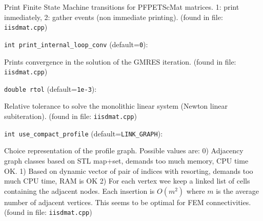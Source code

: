Print Finite State Machine transitions for PFPETScMat matrices.
1: print inmediately, 2: gather events (non immediate printing). 
 (found in file: \verb+iisdmat.cpp+)
\item\verb+int print_internal_loop_conv+ {\rm(default=\verb|0|)}:

Prints convergence in the solution of the GMRES iteration. 
 (found in file: \verb+iisdmat.cpp+)
\item\verb+double rtol+ {\rm(default=\verb|1e-3|)}:

Relative tolerance to solve the monolithic linear
system (Newton linear subiteration).
 (found in file: \verb+iisdmat.cpp+)
\item\verb+int use_compact_profile+ {\rm(default=\verb|LINK_GRAPH|)}:

Choice representation of the profile graph. Possible values are:
0) Adjacency graph classes
based on STL map+set, demands too much memory, CPU time OK.
1) Based on dynamic vector of pair of indices with resorting,
demands too much CPU time, RAM is OK
2) For each vertex wee keep a linked list of cells containing the
adjacent nodes. Each insertion is $O(m^2)$ where $m$ is the average
number of adjacent vertices. This seems to be optimal for
FEM connectivities.
 (found in file: \verb+iisdmat.cpp+)
